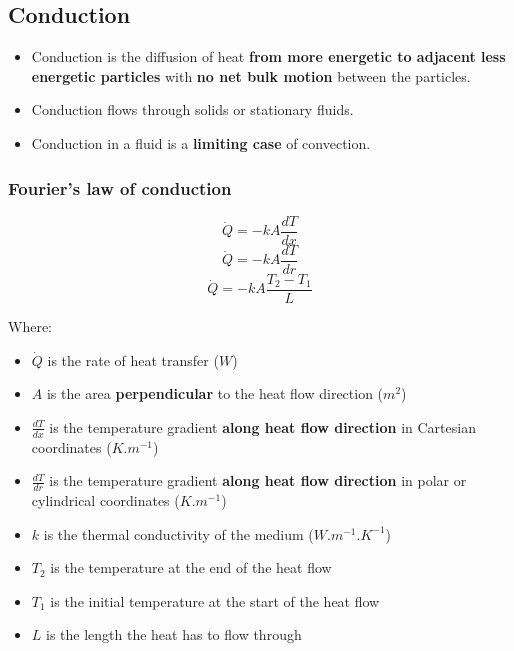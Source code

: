 \documentclass[11pt]{article}
\begin{document}
\subsection{Conduction}
\label{sec:orga9375ff}
\begin{itemize}
\item Conduction is the diffusion of heat \textbf{from more energetic to adjacent less energetic particles} with \textbf{no net bulk motion} between the particles.
\item Conduction flows through solids or stationary fluids.
\item Conduction in a fluid is a \textbf{limiting case} of convection.
\end{itemize}

 \newpage
\subsubsection{Fourier's law of conduction}
\label{sec:orgdb5690e}
\[\dot{Q} = -kA \frac{dT}{dx}\]
\[\dot{Q} = -kA \frac{dT}{dr}\]
\[\dot{Q} = -kA \frac{T_2 - T_1}{L}\]

Where:
\begin{itemize}
\item \(\dot{Q}\) is the rate of heat transfer (\(\unit{W}\))
\item \(A\) is the area \textbf{perpendicular} to the heat flow direction (\(\unit{m^2}\))
\item \(\frac{dT}{dx}\) is the temperature gradient \textbf{along heat flow direction} in Cartesian coordinates (\(\unit{K.m^{-1}}\))
\item \(\frac{dT}{dr}\) is the temperature gradient \textbf{along heat flow direction} in polar or cylindrical coordinates (\(\unit{K.m^{-1}}\))
\item \(k\) is the thermal conductivity of the medium (\(\unit{W.m^{-1}.K^{-1}}\))
\item \(T_2\) is the temperature at the end of the heat flow
\item \(T_1\) is the initial temperature at the start of the heat flow
\item \(L\) is the length the heat has to flow through
\end{itemize}
\end{document}
